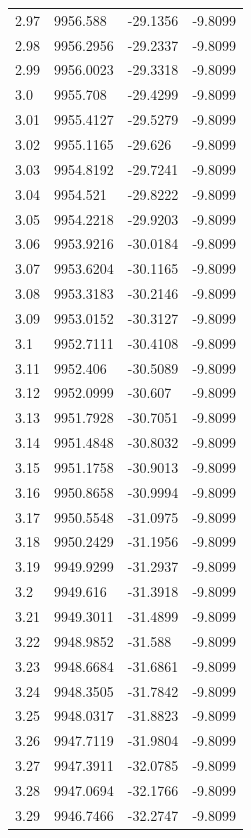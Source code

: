 \begin{table}[H]
\begin{tabular}{llll}
2.97 & 9956.588 & -29.1356 & -9.8099 \\
2.98 & 9956.2956 & -29.2337 & -9.8099 \\
2.99 & 9956.0023 & -29.3318 & -9.8099 \\
3.0 & 9955.708 & -29.4299 & -9.8099 \\
3.01 & 9955.4127 & -29.5279 & -9.8099 \\
3.02 & 9955.1165 & -29.626 & -9.8099 \\
3.03 & 9954.8192 & -29.7241 & -9.8099 \\
3.04 & 9954.521 & -29.8222 & -9.8099 \\
3.05 & 9954.2218 & -29.9203 & -9.8099 \\
3.06 & 9953.9216 & -30.0184 & -9.8099 \\
3.07 & 9953.6204 & -30.1165 & -9.8099 \\
3.08 & 9953.3183 & -30.2146 & -9.8099 \\
3.09 & 9953.0152 & -30.3127 & -9.8099 \\
3.1 & 9952.7111 & -30.4108 & -9.8099 \\
3.11 & 9952.406 & -30.5089 & -9.8099 \\
3.12 & 9952.0999 & -30.607 & -9.8099 \\
3.13 & 9951.7928 & -30.7051 & -9.8099 \\
3.14 & 9951.4848 & -30.8032 & -9.8099 \\
3.15 & 9951.1758 & -30.9013 & -9.8099 \\
3.16 & 9950.8658 & -30.9994 & -9.8099 \\
3.17 & 9950.5548 & -31.0975 & -9.8099 \\
3.18 & 9950.2429 & -31.1956 & -9.8099 \\
3.19 & 9949.9299 & -31.2937 & -9.8099 \\
3.2 & 9949.616 & -31.3918 & -9.8099 \\
3.21 & 9949.3011 & -31.4899 & -9.8099 \\
3.22 & 9948.9852 & -31.588 & -9.8099 \\
3.23 & 9948.6684 & -31.6861 & -9.8099 \\
3.24 & 9948.3505 & -31.7842 & -9.8099 \\
3.25 & 9948.0317 & -31.8823 & -9.8099 \\
3.26 & 9947.7119 & -31.9804 & -9.8099 \\
3.27 & 9947.3911 & -32.0785 & -9.8099 \\
3.28 & 9947.0694 & -32.1766 & -9.8099 \\
3.29 & 9946.7466 & -32.2747 & -9.8099 \\

\end{tabular}
\end{table}
